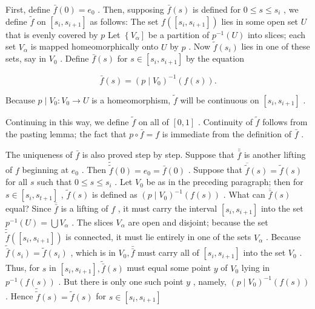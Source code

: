 First, define \(\bar{f}\left( 0\right)  = {e}_{0}\) . Then, supposing \(\bar{f}\left( s\right)\) is defined for \(0 \leq  s \leq  {s}_{i}\) , we define \(\widetilde{f}\) on \(\left\lbrack  {{s}_{i},{s}_{i + 1}}\right\rbrack\) as follows: The set \(f\left( \left\lbrack  {{s}_{i},{s}_{i + 1}}\right\rbrack  \right)\) lies in some open set \(U\) that is evenly covered by \(p\) Let \(\left\{  {V}_{\alpha }\right\rbrack\) be a partition of \({p}^{-1}\left( U\right)\) into slices; each set \({V}_{\alpha }\) is mapped homeomorphically onto \(U\) by \(p\) . Now \(\widetilde{f}\left( {s}_{i}\right)\) lies in one of these sets, say in \({V}_{0}\) . Define \(\bar{f}\left( s\right)\) for \(s \in  \left\lbrack  {{s}_{i},{s}_{i + 1}}\right\rbrack\) by the equation

\[
\bar{f}\left( s\right)  = {\left( p \mid  {V}_{0}\right) }^{-1}\left( {f\left( s\right) }\right) .
\]

Because \(p \mid  {V}_{0} : {V}_{0} \rightarrow  U\) is a homeomorphism, \(\widetilde{f}\) will be continuous on \(\left\lbrack  {{s}_{i},{s}_{i + 1}}\right\rbrack\) .

Continuing in this way, we define \(\widetilde{f}\) on all of \(\left\lbrack  {0,1}\right\rbrack\) . Continuity of \(\widetilde{f}\) follows from the pasting lemma; the fact that \(p \circ  \bar{f} = f\) is immediate from the definition of \(\bar{f}\) .

The uniqueness of \(\bar{f}\) is also proved step by step. Suppose that \(\bar{\bar{f}}\) is another lifting of \(f\) beginning at \({e}_{0}\) . Then \(\widetilde{\widetilde{f}}\left( 0\right)  = {e}_{0} = \bar{f}\left( 0\right)\) . Suppose that \(\overline{\widetilde{f}}\left( s\right)  = \widetilde{f}\left( s\right)\) for all \(s\) such that \(0 \leq  s \leq  {s}_{i}\) . Let \({V}_{0}\) be as in the preceding paragraph; then for \(s \in  \left\lbrack  {{s}_{i},{s}_{t + 1}}\right\rbrack\) , \(\widetilde{f}\left( s\right)\) is defined as \({\left( p \mid  {V}_{0}\right) }^{-1}\left( {f\left( s\right) }\right)\) . What can \(\overline{\bar{f}}\left( s\right)\) equal? Since \(\overline{\bar{f}}\) is a lifting of \(f\) , it must carry the interval \(\left\lbrack  {{s}_{i},{s}_{i + 1}}\right\rbrack\) into the set \({p}^{-1}\left( U\right)  = \bigcup {V}_{\alpha }\) . The slices \({V}_{\alpha }\) are open and disjoint; because the set \(\widetilde{\widetilde{f}}\left( \left\lbrack  {{s}_{i},{s}_{i + 1}}\right\rbrack  \right)\) is connected, it must lie entirely in one of the sets \({V}_{\alpha }\) . Because \(\widetilde{\bar{f}}\left( {s}_{i}\right)  = \widetilde{f}\left( {s}_{i}\right)\) , which is in \({V}_{0},\bar{\bar{f}}\) must carry all of \(\left\lbrack  {{s}_{i},{s}_{i + 1}}\right\rbrack\) into the set \({V}_{0}\) . Thus, for \(s\) in \(\left\lbrack  {{s}_{i},{s}_{i + 1}}\right\rbrack  ,\widetilde{\bar{f}}\left( s\right)\) must equal some point \(y\) of \({V}_{0}\) lying in \({p}^{-1}\left( {f\left( s\right) }\right)\) . But there is only one such point \(y\) , namely, \({\left( p \mid  {V}_{0}\right) }^{-1}\left( {f\left( s\right) }\right)\) . Hence \(\widetilde{\widetilde{f}}\left( s\right)  = \widetilde{f}\left( s\right)\) for \(s \in  \left\lbrack  {{s}_{i},{s}_{i + 1}}\right\rbrack\)

